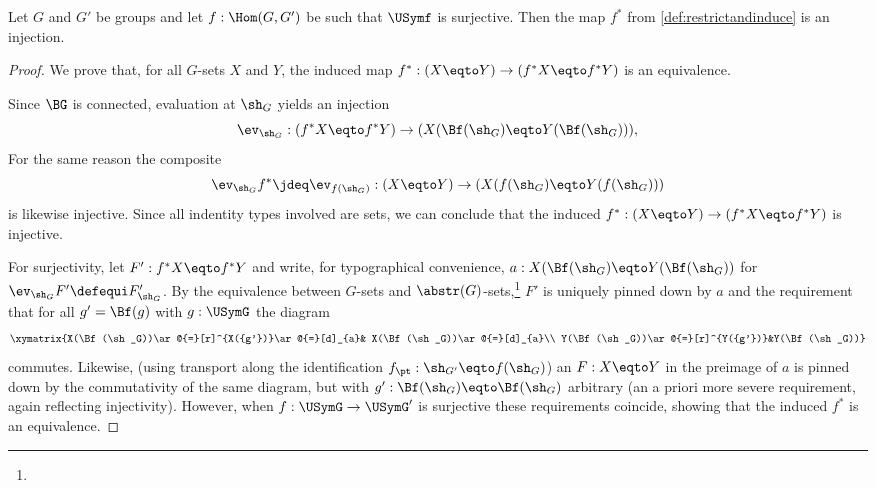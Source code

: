 \begin{lemma}\label{lem:epifullyfaithful}
Let $G$ and $G'$ be groups and 
let $f:\Hom(G,G')$ be such that $\USymf$ is surjective.
Then the map $f^*$ from \cref{def:restrictandinduce} is an injection.
\end{lemma}

\begin{proof}
We prove that, for all $G$-sets $X$ and $Y$, the induced map 
$f^*:(X\eqto Y)\to(f^*X\eqto f^*Y)$ is an equivalence.

Since $\BG$ is connected, evaluation at $\sh_G$  yields an injection
\[
\ev_{\sh_G}:(f^*X\eqto f^*Y)\to(X(\Bf(\sh_G)\eqto Y(\Bf(\sh_G))),
\]
For the same reason the composite
\[
\ev_{\sh_G}f^*\jdeq \ev_{f(\sh_G)}:(X\eqto Y)\to(X(f(\sh_G)\eqto Y(f(\sh_G)))
\]
is likewise injective. Since all indentity types involved are sets,
we can conclude that the induced
$f^*:(X\eqto Y)\to(f^*X\eqto  f^*Y)$ is injective.

For surjectivity, let $F':f^*X\eqto f^*Y$ and write, for typographical
 convenience, $a:X(\Bf(\sh_G)\eqto Y(\Bf(\sh_G))$ for 
 $\ev_{\sh_G}F'\defequi F'_{\sh_G}$.
By the equivalence between $G$-sets and $\abstr(G)$-sets,\footnote{%
} 
$F'$ is uniquely pinned down by $a$ and the requirement that 
for all $g'=\Bf(g)$ with $g:\USymG$ the diagram
$$\xymatrix{X(\Bf(\sh_G))\ar@{=}[r]^{X({g'})}\ar@{=}[d]_{a}&
  X(\Bf(\sh_G))\ar@{=}[d]_{a}\\
  Y(\Bf(\sh_G))\ar@{=}[r]^{Y({g'})}&Y(\Bf(\sh_G))}
$$
commutes.  Likewise, (using transport along the identification
$f_\pt:\sh_{G'}\eqto f(\sh_G)$) an $F:X\eqto Y$ in the preimage of $a$ 
is pinned down by the commutativity of the same diagram, 
but with $g':\Bf(\sh_G)\eqto \Bf(\sh_G)$ arbitrary (an a priori more severe
requirement, again reflecting injectivity).
However, when $f:\USymG\to\USymG'$ is surjective these 
requirements coincide, showing that the induced $f^*$ is an equivalence.
\qedhere




\end{proof}
